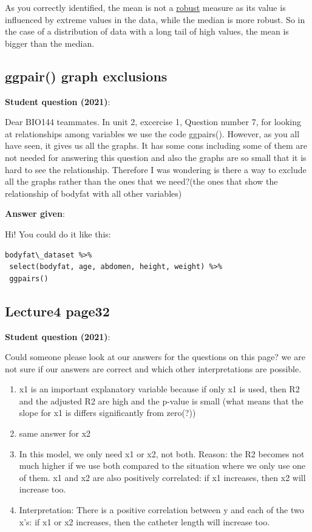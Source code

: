\documentclass[
  letterpaper,
  8pt,
  a4paper]{book}
\providecommand{\tightlist}{%
  \setlength{\itemsep}{0pt}\setlength{\parskip}{0pt}}
\begin{document}
As you correctly identified, the mean is not a
\href{https://en.wikipedia.org/wiki/Robust_statistics\#Examples}{robust}
measure as its value is influenced by extreme values in the data, while
the median is more robust. So in the case of a distribution of data with
a long tail of high values, the mean is bigger than the median.

\subsection*{ggpair() graph exclusions}\label{ggpair-graph-exclusions}

\textbf{Student question (2021)}:

Dear BIO144 teammates. In unit 2, excercise 1, Question number 7, for
looking at relationships among variables we use the code ggpairs().
However, as you all have seen, it gives us all the graphs. It has some
cons including some of them are not needed for answering this question
and also the graphs are so small that it is hard to see the
relationship. Therefore I was wondering is there a way to exclude all
the graphs rather than the ones that we need?(the ones that show the
relationship of bodyfat with all other variables)

\textbf{Answer given}:

Hi! You could do it like this:

\begin{verbatim}
bodyfat\_dataset %>%
 select(bodyfat, age, abdomen, height, weight) %>% 
 ggpairs()
\end{verbatim}

\subsection*{Lecture4 page32}\label{lecture4-page32}

\textbf{Student question (2021)}:

Could someone please look at our answers for the questions on this page?
we are not sure if our answers are correct and which other
interpretations are possible.

\begin{enumerate}
\def\labelenumi{\arabic{enumi}.}
\tightlist
\item
  x1 is an important explanatory variable because if only x1 is used,
  then R2 and the adjusted R2 are high and the p-value is small (what
  means that the slope for x1 is differs significantly from zero(?))
\item
  same answer for x2
\item
  In this model, we only need x1 or x2, not both. Reason: the R2 becomes
  not much higher if we use both compared to the situation where we only
  use one of them. x1 and x2 are also positively correlated: if x1
  increases, then x2 will increase too.
\item
  Interpretation: There is a positive correlation between y and each of
  the two x's: if x1 or x2 increases, then the catheter length will
  increase too.
\end{enumerate}
\end{document}
